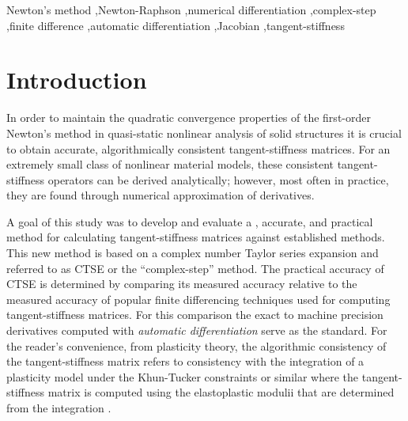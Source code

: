 \documentclass[preprint,12pt]{elsarticle}
\begin{document}
\begin{frontmatter}
\begin{abstract}
\end{abstract}

\begin{keyword}
Newton's method \sep Newton-Raphson \sep numerical differentiation \sep complex-step \sep finite difference \sep automatic differentiation \sep Jacobian \sep tangent-stiffness
\end{keyword}

\end{frontmatter}



\section{Introduction}
\label{sec:intro} 

In order to maintain the quadratic convergence properties of the first-order
Newton's method \cite{belytschko1999nonlinear} \cite[Ch.~13]{young2009} in
quasi-static nonlinear analysis of solid structures it is crucial to obtain
accurate, algorithmically consistent tangent-stiffness matrices. For an
extremely small class of nonlinear material models, these consistent
tangent-stiffness operators can be derived analytically; however, most often in
practice, they are found through numerical approximation of derivatives. 

A goal of this study was to develop and evaluate a 
, accurate, and practical method
for calculating tangent-stiffness matrices against established methods.  This
new method is based on a complex number Taylor series expansion and referred to
as CTSE or the ``complex-step'' method. The practical accuracy of CTSE is
determined by comparing its measured accuracy relative to the measured accuracy of popular finite
differencing techniques used for computing tangent-stiffness matrices. For this
comparison the exact to machine precision derivatives computed with
\emph{automatic differentiation} serve as the standard. For the reader's convenience, from plasticity theory, the algorithmic
consistency of the tangent-stiffness matrix refers to consistency with the
integration of a plasticity model under the Khun-Tucker constraints or similar
where the tangent-stiffness matrix is computed using the elastoplastic modulii
that are determined from the integration \cite{simo1998}. 
\end{document}
